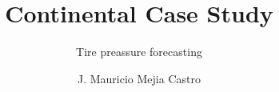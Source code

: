 \documentclass[11pt]{beamer}
\begin{document}
	\author{J. Mauricio Mejia Castro}
	\title{Continental Case Study}
	\subtitle{Tire preassure forecasting}
	\begin{frame}[plain]
		\maketitle
	\end{frame}
	
	\begin{frame}
		\frametitle{}
	\end{frame}
\end{document}
